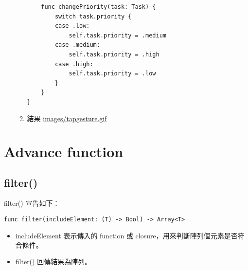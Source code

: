 \documentclass[a4paper,12pt]{article}
\begin{document}
\begin{enumerate}
\begin{enumerate}
\begin{lstlisting}
    func changePriority(task: Task) {
        switch task.priority {
        case .low:
            self.task.priority = .medium
        case .medium:
            self.task.priority = .high
        case .high:
            self.task.priority = .low
        }
    }
}
\end{lstlisting}
\item 結果
\label{sec:org154d9dc}
\url{images/tapgesture.gif}\\
\end{enumerate}
\end{enumerate}

\section{Advance function}
\label{SW-AdvFuncs}
\subsection{filter()}
\label{sec:orgc8d03f2}
filter() 宣告如下：\\
\lstset{breaklines=true,language=swift,label= ,caption= ,captionpos=b,firstnumber=1,numbers=left}
\begin{lstlisting}
func filter(includeElement: (T) -> Bool) -> Array<T>
\end{lstlisting}
\begin{itemize}
\item includeElement 表示傳入的 function 或 closure，用來判斷陣列個元素是否符合條件。\\
\item filter() 回傳結果為陣列。\\
\end{itemize}
\end{document}
